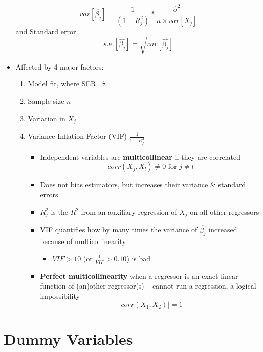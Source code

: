 \documentclass{article}
\begin{document}
\begin{itemize}
			\begin{equation*}
		var[\hat{\beta_j}]=\frac{1}{(1-R^2_j)}*\frac{\hat{\sigma}^2}{n\times var[X_j]}
		\end{equation*}
	and Standard error 
		\begin{equation*}
		s.e.[\hat{\beta_j}]=\sqrt{var[\hat{\beta_j}]}
		\end{equation*}
	\item Affected by 4 major factors: 
	\begin{enumerate}
		\item Model fit, where SER=$\hat{\sigma}$
		\item Sample size $n$
		\item Variation in $X_j$
		\item Variance Inflation Factor (VIF) $\frac{1}{1-R^2_j}$
		\begin{itemize}
			\item Independent variables are \textbf{multicollinear} if they are correlated 
			\begin{equation*}
				corr(X_j, X_l) \neq 0 \text{ for } j \neq l
			\end{equation*}
			\item Does not bias estimators, but increases their variance \& standard errors 
			\item $R^2_j$ is the $R^2$ from an auxiliary regression of $X_j$ on all other regressors
			\item VIF quantifies how by many times the variance of $\hat{\beta_j}$ increased because of multicollinearity
			\begin{itemize}
				\item $VIF>10$ (or $\frac{1}{VIF}>0.10$) is bad 
			\end{itemize}
			\item \textbf{Perfect multicollinearity} when a regressor is an exact linear function of (an)other regressor(s) -- cannot run a regression, a logical impossibility 
			\begin{equation*}
			|corr(X_1, X_2)| = 1	
			\end{equation*}
		\end{itemize}
	\end{enumerate}
\end{itemize}

\clearpage 

\section*{Dummy Variables}
\end{document}
